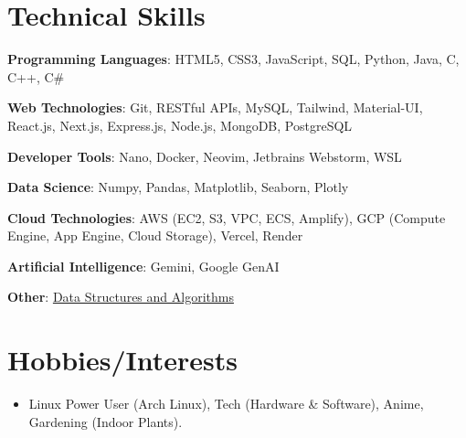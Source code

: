 \documentclass[letterpaper,11pt]{article}
\newcommand{\resumeItem}[1]{
  \item\small{ %
    {#1 \vspace{-2pt}}
  }
}
\newcommand{\resumeSubHeadingListStart}{\begin{itemize}[leftmargin=0.15in, label={}]}
\newcommand{\resumeSubHeadingListEnd}{\end{itemize}}
\begin{document}
\section{Technical Skills}
\begin{itemize}[leftmargin=0.15in, label={}]
  \small{ %
    \item \textbf{Programming Languages}{: HTML5, CSS3, JavaScript, SQL, Python, Java, C, C++, C\#} \\ %
    \item \textbf{Web Technologies}{: Git, RESTful APIs, MySQL, Tailwind, Material-UI, React.js, Next.js, Express.js, Node.js, MongoDB, PostgreSQL} \\ %
    \item \textbf{Developer Tools}{: Nano, Docker, Neovim, Jetbrains Webstorm, WSL} \\ %
    \item \textbf{Data Science}{: Numpy, Pandas, Matplotlib, Seaborn, Plotly} \\ %
    \item \textbf{Cloud Technologies}{: AWS (EC2, S3, VPC, ECS, Amplify), GCP (Compute Engine, App Engine, Cloud Storage), Vercel, Render} \\ %
    \item \textbf{Artificial Intelligence}{: Gemini, Google GenAI} \\ %
    \item \textbf{Other}{: \href{https://github.com/abhay-byte/DSA_Practice}{Data Structures and Algorithms}}
  }
\end{itemize}


\section{Hobbies/Interests}
  \resumeSubHeadingListStart
    \resumeItem{Linux Power User (Arch Linux), Tech (Hardware \& Software), Anime, Gardening (Indoor Plants).} %
  \resumeSubHeadingListEnd

\end{document}
